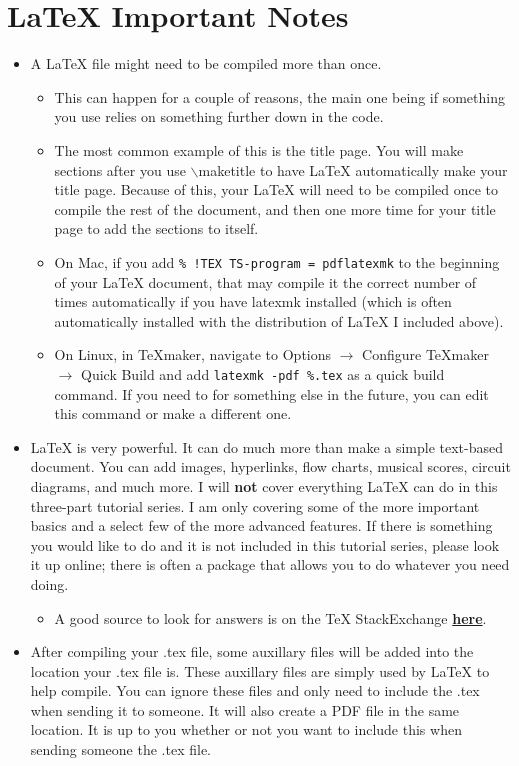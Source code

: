 \section{\LaTeX{} Important Notes}
	\begin{itemize}
		\item A \LaTeX{} file might need to be compiled more than once.
		\begin{itemize}
			\item This can happen for a couple of reasons, the main one being if something you use relies on something further down in the code.
			\item The most common example of this is the title page. You will make sections after you use $\backslash$maketitle to have \LaTeX{} automatically make your title page. Because of this, your \LaTeX{} will need to be compiled once to compile the rest of the document, and then one more time for your title page to add the sections to itself.
			\item On Mac, if you add \texttt{\% !TEX TS-program = pdflatexmk} to the beginning of your \LaTeX{} document, that may compile it the correct number of times automatically if you have latexmk installed (which is often automatically installed with the distribution of \LaTeX{} I included above).
			\item On Linux, in TeXmaker, navigate to Options \(\rightarrow\) Configure TeXmaker \(\rightarrow\) Quick Build and add \texttt{latexmk -pdf \%.tex} as a quick build command. If you need to for something else in the future, you can edit this command or make a different one.
		\end{itemize}
		\item \LaTeX{} is very powerful. It can do much more than make a simple text-based document. You can add images, hyperlinks, flow charts, musical scores, circuit diagrams, and much more. I will \textbf{not} cover everything \LaTeX{} can do in this three-part tutorial series. I am only covering some of the more important basics and a select few of the more advanced features. If there is something you would like to do and it is not included in this tutorial series, please look it up online; there is often a package that allows you to do whatever you need doing.
		\begin{itemize}
			\item A good source to look for answers is on the \TeX{} StackExchange \href{https://tex.stackexchange.com/}{\textbf{here}}.
		\end{itemize}
		\item After compiling your .tex file, some auxillary files will be added into the location your .tex file is. These auxillary files are simply used by \LaTeX{} to help compile. You can ignore these files and only need to include the .tex when sending it to someone. It will also create a PDF file in the same location. It is up to you whether or not you want to include this when sending someone the .tex file.
	\end{itemize}
	
